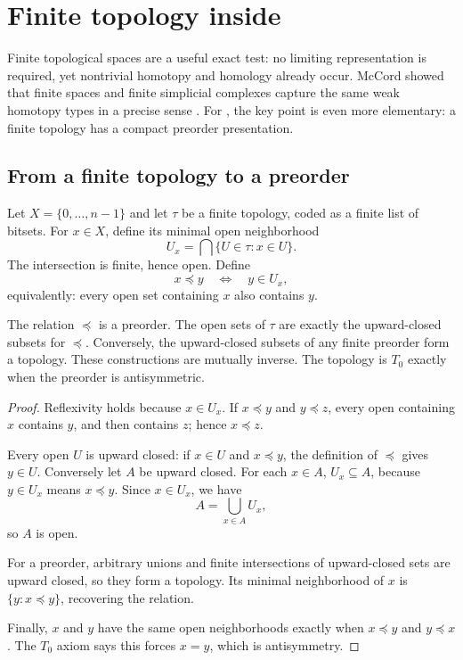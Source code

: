 
\section{Finite topology inside \ipra}
\label{sec:finite-topology}

Finite topological spaces are a useful exact test: no limiting representation is required, yet nontrivial homotopy and homology already occur.  McCord showed that finite spaces and finite simplicial complexes capture the same weak homotopy types in a precise sense \cite{McCord1966}.  For \ipra, the key point is even more elementary: a finite topology has a compact preorder presentation.

\subsection{From a finite topology to a preorder}

Let $X=\{0,\ldots,n-1\}$ and let $\tau$ be a finite topology, coded as a finite list of bitsets.  For $x\in X$, define its minimal open neighborhood
\[
  U_x=\bigcap\{U\in\tau:x\in U\}.
\]
The intersection is finite, hence open.  Define
\[
  x\preceq y
  \quad\Longleftrightarrow\quad
  y\in U_x,
\]
equivalently: every open set containing $x$ also contains $y$.

\begin{theorem}
\label{thm:finite-preorder}
The relation $\preceq$ is a preorder.  The open sets of $\tau$ are exactly the upward-closed subsets for $\preceq$.  Conversely, the upward-closed subsets of any finite preorder form a topology.  These constructions are mutually inverse.  The topology is $T_0$ exactly when the preorder is antisymmetric.
\end{theorem}

\begin{proof}
Reflexivity holds because $x\in U_x$.  If $x\preceq y$ and $y\preceq z$, every open containing $x$ contains $y$, and then contains $z$; hence $x\preceq z$.

Every open $U$ is upward closed: if $x\in U$ and $x\preceq y$, the definition of $\preceq$ gives $y\in U$.  Conversely let $A$ be upward closed.  For each $x\in A$, $U_x\subseteq A$, because $y\in U_x$ means $x\preceq y$.  Since $x\in U_x$, we have
\[
  A=\bigcup_{x\in A}U_x,
\]
so $A$ is open.

For a preorder, arbitrary unions and finite intersections of upward-closed sets are upward closed, so they form a topology.  Its minimal neighborhood of $x$ is $\{y:x\preceq y\}$, recovering the relation.

Finally, $x$ and $y$ have the same open neighborhoods exactly when $x\preceq y$ and $y\preceq x$.  The $T_0$ axiom says this forces $x=y$, which is antisymmetry.
\end{proof}

